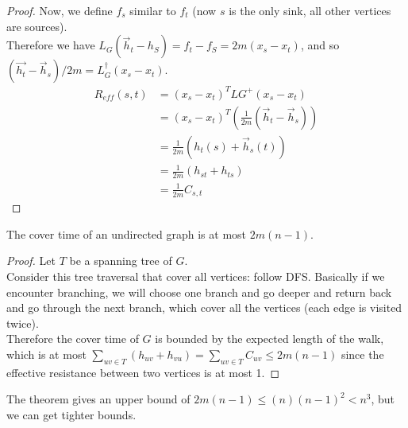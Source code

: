 \documentclass[12pt]{article}
\newenvironment{theorem}[2][Theorem]{\begin{trivlist}
\item[\hskip \labelsep {\bfseries #1}\hskip \labelsep {\bfseries #2.}]}{\end{trivlist}}
\begin{document}
\begin{proof}
	\newline
	Now, we define $f_s$ similar to $f_t$ (now $s$ is the only sink, all other vertices are sources).\\
	\newline
	Therefore we have $L _ { G } \left( \vec { h } _ { t } - h _ { S } \right) = f _ { t } - f _ { S } = 2 m \left( x _ { s } - x _ { t } \right)$, and so $\left( \vec { h _ { t } } - \vec { h } _ { s } \right) / 2 m = L _ { G } ^ { \dagger } \left( x _ { s } - x _ { t } \right)$. 
	\begin{align*}
	R _ { e f f } ( s , t ) &=( x _ { s } - x _ { t })^T L{G}^{+}( x _ { s } - x _ { t }) \\
							&= \left( x _ { s } - x _ { t } \right) ^ { T } \left( \frac { 1 } { 2 m } \left( \vec { h } _ { t } - \vec { h } _ { s } \right) \right) \\
							&= \frac { 1 } { 2 m } \left( h _ { t } ( s ) + \vec { h } _ { s } ( t ) \right) \\
							&= \frac { 1 } { 2 m } \left( h _ { s t } + h _ { t s } \right)\\
							&= \frac { 1 } { 2 m } C_{s, t}
	\end{align*}
\end{proof}

\begin{theorem}{2}
	The cover time of an undirected graph is at most $2m(n - 1)$.
\end{theorem}
\begin{proof}
	Let $T$ be a spanning tree of $G$.\\
	\newline
	Consider this tree traversal that cover all vertices: follow DFS. Basically if we encounter branching, we will choose one branch and go deeper and return back and go through the next branch, which cover all the vertices (each edge is visited twice).\\
	\newline
	Therefore the cover time of $G$ is bounded by the expected length of the walk, which is at most $\sum_{uv \in T}(h_{uv} + h_{vu}) = \sum_{uv \in T}C_{uv} \leq 2m(n-1)$ since the effective resistance between two vertices is at most 1.
\end{proof}

The theorem gives an upper bound of $2m(n - 1) \leq (n)(n - 1)^2 < n^3$, but we can get tighter bounds.
\end{document}

